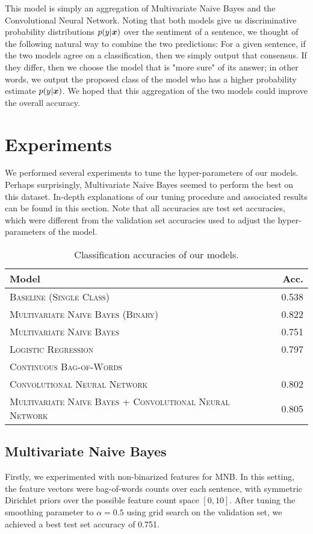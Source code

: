 \documentclass[11pt]{article}
\begin{document}
This model is simply an aggregation of Multivariate Naive Bayes and the Convolutional Neural Network.  Noting that both models give us discriminative probability distributions $p(y \vert \boldsymbol{x})$ over the sentiment of a sentence, we thought of the following natural way to combine the two predictions: For a given sentence, if the two models agree on a classification, then we simply output that consensus.  If they differ, then we choose the model that is "more sure" of its answer; in other words, we output the proposed class of the model who has a higher probability estimate $p(y \vert \boldsymbol{x})$.  We hoped that this aggregation of the two models could improve the overall accuracy.   
\section{Experiments}

We performed several experiments to tune the hyper-parameters of our models.  Perhaps surprisingly, Multivariate Naive Bayes seemed to perform the best on this dataset.  In-depth explanations of our tuning procedure and associated results can be found in this section.  Note that all accuracies are test set accuracies, which were different from the validation set accuracies used to adjust the hyper-parameters of the model.  

\begin{table}[H]
\centering
\begin{tabular}{llr}
 \toprule
 Model &  & Acc. \\
 \midrule
 \textsc{Baseline (Single Class)} & & 0.538\\
 \textsc{Multivariate Naive Bayes (Binary)} & & 0.822 \\
 \textsc{Multivariate Naive Bayes} & & 0.751 \\
 \textsc{Logistic Regression} & & 0.797 \\
 \textsc{Continuous Bag-of-Words} & & \\
 \textsc{Convolutional Neural Network} & & 0.802 \\
 \textsc{Multivariate Naive Bayes + Convolutional Neural Network}  & & 0.805 \\
 \bottomrule 
\end{tabular}
\caption{\label{tab:results} Classification accuracies of our models.}
\end{table}

\subsection{Multivariate Naive Bayes} 
Firstly, we experimented with non-binarized features for MNB. In this setting, the feature vectors were bag-of-words counts over each sentence, with symmetric Dirichlet priors over the possible feature count space $[0, 10]$. After tuning the smoothing parameter to $\alpha = 0.5$ using grid search on the validation set, we achieved a best test set accuracy of 0.751. 
\end{document}
